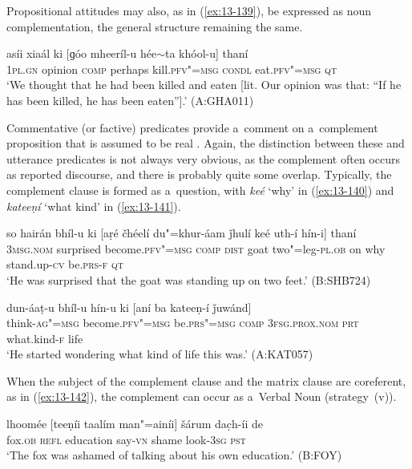 Propositional attitudes may also, as in (\ref{ex:13-139}), be expressed as noun complementation, the general structure remaining the same.

\begin{exe}
\ex
\label{ex:13-139}
\gll asíi xiaál ki [ɡóo mheeríl-u hée$\sim$ta  khóol-u] thaní \\
\textsc{1pl}.\textsc{gn}  opinion \textsc{comp} perhaps kill.\textsc{pfv"=msg}  \textsc{condl} eat.\textsc{pfv"=msg} \textsc{qt} \\
\glt `We thought that he had been killed and eaten [lit. Our opinion was that: ``If he has been killed, he has been eaten''].' (A:GHA011) 
\end{exe}

 Commentative (or factive) predicates provide a~comment on a~complement proposition that is assumed to be real \citep[117]{noonan1985}. Again, the distinction between these and utterance predicates is not always very obvious, as the complement often occurs as reported discourse, and there is probably quite some overlap. Typically, the complement clause is formed as a~question, with \textit{keé} `why' in (\ref{ex:13-140}) and \textit{kateeṇí} `what kind' in (\ref{ex:13-141}).

\begin{exe}
\ex
\label{ex:13-140}
\gll so hairán bhíl-u ki [aṛé čhéelí  du"=khur-áam ǰhulí keé uth-í hín-i] thaní \\
\textsc{3msg.nom}  surprised become.\textsc{pfv"=msg} \textsc{comp} \textsc{dist} goat  two"=leg-\textsc{pl.ob} on why stand.up-\textsc{cv} be.\textsc{prs-f} \textsc{qt} \\
\glt `He was surprised that the goat was standing up on two feet.' (B:SHB724)

\ex
\label{ex:13-141}
\gll dun-áaṭ-u bhíl-u hín-u ki  [aní ba kateeṇ-í ǰuwánd] \\
think-\textsc{ag"=msg} become.\textsc{pfv"=msg} be.\textsc{prs"=msg} \textsc{comp}  \textsc{3fsg.prox.nom} \textsc{prt} what.kind-\textsc{f} life  \\
\glt `He started wondering what kind of life this was.' (A:KAT057) 
\end{exe}

When the subject of the complement clause and the matrix clause are coreferent, as in (\ref{ex:13-142}), the complement can occur as a~Verbal Noun (strategy~(v)).

\begin{exe}
\ex
\label{ex:13-142}
\gll lhoomée [teeṇíi taalím man"=ainíi] šárum  dac̣h-íi de \\
fox.\textsc{ob} \textsc{ refl} education say-\textsc{vn} shame look-\textsc{3sg} \textsc{pst} \\
\glt `The fox was ashamed of talking about his own education.' (B:FOY) 
\end{exe}


